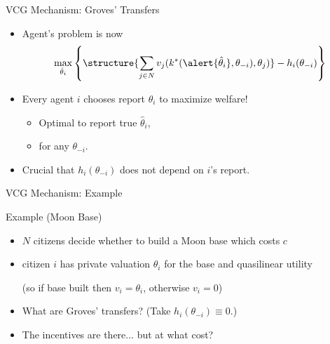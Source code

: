 \documentclass[english,10pt
,aspectratio=169
,handout
]{beamer}
\begin{document}
\begin{frame}{VCG Mechanism: Groves' Transfers}
\begin{itemize}
	\item Agent's problem is now
	\vspace{-0.5em}\begin{align*}
	\max_{\hat{\theta}_i} \left\{ \structure{ \sum_{j \in N} v_{j}(k^*(\alert{\hat{\theta}_i},\theta_{-i}), \theta_{j}) } - h_{i}(\theta_{-i}) \right\}
	\end{align*}
	\item Every agent $i$ chooses report $\hat{\theta}_i$ to maximize welfare!
	\begin{itemize}
		\item Optimal to report true $\hat{\theta}_i$,
		\item for any $\theta_{-i}$.
	\end{itemize}
	\item Crucial that $h_i(\theta_{-i})$ does not depend on $i$'s report.
\end{itemize}
\end{frame}


\begin{frame}{VCG Mechanism: Example}
\begin{exampleblock}{Example (Moon Base)}
	\begin{itemize}
		\item $N$ citizens decide whether to build a Moon base which costs $c$
		\item citizen $i$ has private valuation $\theta_{i}$ for the base and quasilinear utility
		
		(so if base built then $v_i = \theta_i$, otherwise $v_i = 0$)
	\end{itemize}
\end{exampleblock}
\begin{itemize}
	\item What are Groves' transfers? (Take $h_i(\theta_{-i}) \equiv 0$.)
	\item The incentives are there... but at what cost?
\end{itemize}
\end{frame}
\end{document}
